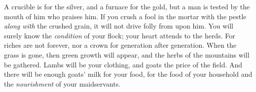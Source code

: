 \begin{biblechapter}
\verse A crucible is for the silver, and a furnace for the gold, 
but a man is tested by the mouth of him who praises him.
\verse If you crush a fool in the mortar with the pestle \textit{along with} the crushed grain, 
it will not drive folly from upon him.
\verse You will surely know the \textit{condition} of your flock; 
your heart attends to the herds.
\verse For riches are not forever, 
nor a crown for generation after generation.
\verse When the grass is gone, then green growth will appear, 
and the herbs of the mountains will be gathered.
\verse Lambs will be your clothing, 
and goats the price of the field.
\verse And there will be enough goats’ milk for your food, 
for the food of your household and the \textit{nourishment} of your maidservants.
\end{biblechapter}

